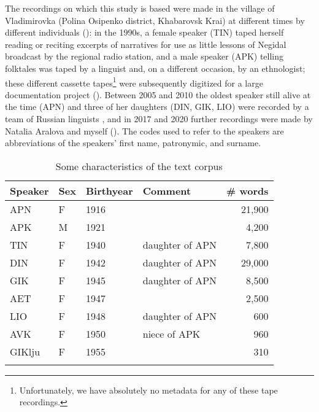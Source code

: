 \documentclass[output=paper]{langscibook}
\begin{document}
The recordings on which this study is based were made in the village of Vladimirovka (Polina Osipenko district, Khabarovsk Krai) at different times by different individuals (): in the 1990s, a female speaker (TIN) taped herself reading or reciting excerpts of narratives for use as little lessons of Negidal broadcast by the regional radio station, and a male speaker (APK) telling folktales was taped by a linguist and, on a different occasion, by an ethnologist; these different cassette tapes\footnote{Unfortunately, we have absolutely no metadata for any of these tape recordings.} were subsequently digitized for a large documentation project (\citealt{PakendorfAralova2017}). Between 2005 and 2010 the oldest speaker still alive at the time (APN) and three of her daughters (DIN, GIK, LIO) were recorded by a team of Russian linguists \citep{Kalinina2013}, and in 2017 and 2020 further recordings were made by Natalia Aralova and myself (\citealt{PakendorfAralova2017}). The codes used to refer to the speakers are abbreviations of the speakers’ first name, patronymic, and surname.

\begin{table}
\begin{tabular}{llllr}
\lsptoprule
Speaker & Sex & Birthyear & Comment & \# words\\
\midrule
APN & F & {1916} &                 &  21,900\\
APK & M & {1921} &                 &  4,200\\
TIN & F & {1940} & daughter of APN &  7,800\\
DIN & F & {1942} & daughter of APN &  29,000\\
GIK & F & {1945} & daughter of APN &  8,500\\
AET & F & {1947} &                 &  2,500\\
LIO & F & {1948} & daughter of APN &  600\\
AVK & F & {1950} & niece of APK    &  960\\
GIKlju & F & {1955} &              &  310\\
\lspbottomrule
\end{tabular}
\caption{Some characteristics of the text corpus}
\label{tab:pakendorf:1}
\end{table}
\end{document}
